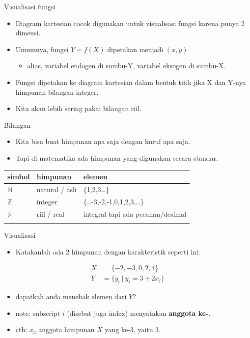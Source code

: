 \documentclass[
  ignorenonframetext,
]{beamer}
\providecommand{\tightlist}{%
  \setlength{\itemsep}{0pt}\setlength{\parskip}{0pt}}\usepackage{longtable,booktabs,array}
\begin{document}
\begin{frame}{Visualisasi fungsi}
\label{visualisasi-fungsi}
\begin{itemize}
\item
  Diagram kartesian cocok digunakan untuk visualisasi fungsi karena
  punya 2 dimensi.
\item
  Umumnya, fungsi \(Y=f(X)\) dipetakan menjadi \((x,y)\)

  \begin{itemize}
  \tightlist
  \item
    alias, variabel endogen di sumbu-Y, variabel eksogen di sumbu-X.
  \end{itemize}
\item
  Fungsi dipetakan ke diagram kartesian dalam bentuk titik jika X dan
  Y-nya himpunan bilangan integer.
\item
  Kita akan lebih sering pakai bilangan riil.
\end{itemize}
\end{frame}

\begin{frame}{Bilangan}
\label{bilangan}
\begin{itemize}
\item
  Kita bisa buat himpunan apa saja dengan huruf apa saja.
\item
  Tapi di matematika ada himpunan yang digunakan secara standar.
\end{itemize}

\begin{longtable}[]{@{}lll@{}}
\toprule\noalign{}
simbol & himpunan & elemen \\
\midrule\noalign{}
\endhead
\(\mathbb{N}\) & natural / asli & \{1,2,3\ldots\} \\
\(\mathbb{Z}\) & integer & \{\ldots-3,-2,-1,0,1,2,3,\ldots\} \\
\(\mathbb{R}\) & riil / real & integral tapi ada pecahan/desimal \\
\bottomrule\noalign{}
\end{longtable}
\end{frame}

\begin{frame}{Visualisasi}
\label{visualisasi-2}
\begin{itemize}
\tightlist
\item
  Katakanlah ada 2 himpunan dengan karakteristik seperti ini:
\end{itemize}

\[
\begin{align*}
X&=\{-2,-3,0,2,4\} \\
Y&=\{y_i \ |\  y_i=3+2x_i\}
\end{align*}
\]

\begin{itemize}
\item
  dapatkah anda menebak elemen dari \(Y\)?
\item
  note: subscript \(i\) (disebut juga index) menyatakan \textbf{anggota
  ke-}.
\item
  cth: \(x_3\) anggota himpunan \(X\) yang ke-3, yaitu 3.
\end{itemize}
\end{frame}
\end{document}
